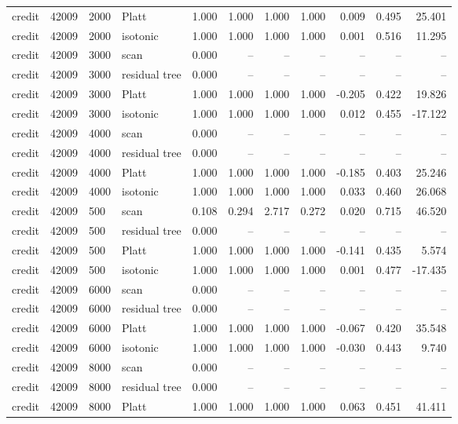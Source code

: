\begin{tabular}{lrllrrrrrrr}
credit & 42009 & 2000 & Platt & 1.000 & 1.000 & 1.000 & 1.000 & 0.009 & 0.495 & 25.401 \\
credit & 42009 & 2000 & isotonic & 1.000 & 1.000 & 1.000 & 1.000 & 0.001 & 0.516 & 11.295 \\
credit & 42009 & 3000 & scan & 0.000 & -- & -- & -- & -- & -- & -- \\
credit & 42009 & 3000 & residual tree & 0.000 & -- & -- & -- & -- & -- & -- \\
credit & 42009 & 3000 & Platt & 1.000 & 1.000 & 1.000 & 1.000 & -0.205 & 0.422 & 19.826 \\
credit & 42009 & 3000 & isotonic & 1.000 & 1.000 & 1.000 & 1.000 & 0.012 & 0.455 & -17.122 \\
credit & 42009 & 4000 & scan & 0.000 & -- & -- & -- & -- & -- & -- \\
credit & 42009 & 4000 & residual tree & 0.000 & -- & -- & -- & -- & -- & -- \\
credit & 42009 & 4000 & Platt & 1.000 & 1.000 & 1.000 & 1.000 & -0.185 & 0.403 & 25.246 \\
credit & 42009 & 4000 & isotonic & 1.000 & 1.000 & 1.000 & 1.000 & 0.033 & 0.460 & 26.068 \\
credit & 42009 & 500 & scan & 0.108 & 0.294 & 2.717 & 0.272 & 0.020 & 0.715 & 46.520 \\
credit & 42009 & 500 & residual tree & 0.000 & -- & -- & -- & -- & -- & -- \\
credit & 42009 & 500 & Platt & 1.000 & 1.000 & 1.000 & 1.000 & -0.141 & 0.435 & 5.574 \\
credit & 42009 & 500 & isotonic & 1.000 & 1.000 & 1.000 & 1.000 & 0.001 & 0.477 & -17.435 \\
credit & 42009 & 6000 & scan & 0.000 & -- & -- & -- & -- & -- & -- \\
credit & 42009 & 6000 & residual tree & 0.000 & -- & -- & -- & -- & -- & -- \\
credit & 42009 & 6000 & Platt & 1.000 & 1.000 & 1.000 & 1.000 & -0.067 & 0.420 & 35.548 \\
credit & 42009 & 6000 & isotonic & 1.000 & 1.000 & 1.000 & 1.000 & -0.030 & 0.443 & 9.740 \\
credit & 42009 & 8000 & scan & 0.000 & -- & -- & -- & -- & -- & -- \\
credit & 42009 & 8000 & residual tree & 0.000 & -- & -- & -- & -- & -- & -- \\
credit & 42009 & 8000 & Platt & 1.000 & 1.000 & 1.000 & 1.000 & 0.063 & 0.451 & 41.411 \\

\end{tabular}
